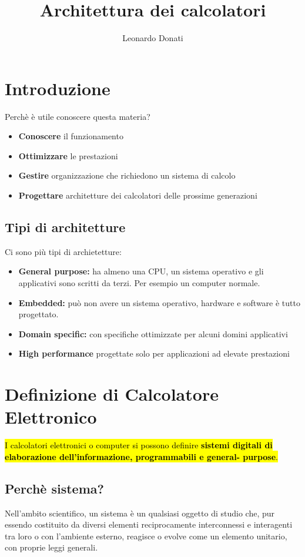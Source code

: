 \documentclass{article}
\title{Architettura dei calcolatori}
\author{Leonardo Donati}
\begin{document}
\maketitle
\tableofcontents

\newpage
\section{Introduzione}
Perchè è utile conoscere questa materia?
\begin{itemize}
    \item \textbf{Conoscere} il funzionamento
    \item \textbf{Ottimizzare} le prestazioni
    \item \textbf{Gestire} organizzazione che richiedono un sistema di calcolo
    \item \textbf{Progettare} architetture dei calcolatori delle prossime generazioni
\end{itemize}

\subsection{Tipi di architetture}
Ci sono più tipi di archietetture:
\begin{itemize}
    \item \textbf{General purpose:} ha almeno una CPU, un sistema operativo e gli applicativi sono scritti da terzi. Per esempio un computer normale.
    \item \textbf{Embedded:} può non avere un sistema operativo, hardware e software è tutto progettato.
    \item \textbf{Domain specific:} con specifiche ottimizzate per alcuni domini applicativi
    \item \textbf{High performance} progettate solo per applicazioni ad elevate prestazioni
\end{itemize}

\section{Definizione di Calcolatore Elettronico}
\hl{I calcolatori elettronici o computer si possono definire \textbf{sistemi digitali di elaborazione dell’informazione, programmabili e general-
purpose}.}

\subsection{Perchè sistema?}
Nell’ambito scientifico, un sistema è un qualsiasi oggetto di studio che, pur essendo costituito da diversi elementi reciprocamente interconnessi e interagenti tra loro o con l’ambiente esterno, reagisce o evolve come un elemento unitario, con proprie leggi generali.
\end{document}
